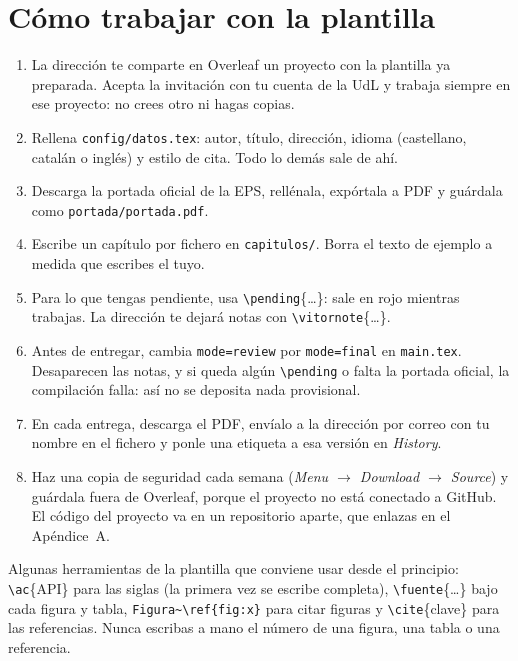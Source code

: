 \documentclass[11pt,a4paper]{article}
\newcommand{\cmd}[1]{\texttt{\textbackslash #1}}
\begin{document}
\section{Cómo trabajar con la plantilla}
\label{sec:plantilla}

\begin{enumerate}
  \item La dirección te comparte en Overleaf un proyecto con la plantilla ya
        preparada. Acepta la invitación con tu cuenta de la UdL y trabaja
        siempre en ese proyecto: no crees otro ni hagas copias.
  \item Rellena \texttt{config/datos.tex}: autor, título, dirección, idioma
        (castellano, catalán o inglés) y estilo de cita. Todo lo demás sale de
        ahí.
  \item Descarga la portada oficial de la EPS, rellénala, expórtala a PDF y
        guárdala como \texttt{portada/portada.pdf}.
  \item Escribe un capítulo por fichero en \texttt{capitulos/}. Borra el texto
        de ejemplo a medida que escribes el tuyo.
  \item Para lo que tengas pendiente, usa \cmd{pending}\{\ldots\}: sale en rojo
        mientras trabajas. La dirección te dejará notas con
        \cmd{vitornote}\{\ldots\}.
  \item Antes de entregar, cambia \texttt{mode=review} por \texttt{mode=final}
        en \texttt{main.tex}. Desaparecen las notas, y si queda algún
        \cmd{pending} o falta la portada oficial, la compilación falla: así no
        se deposita nada provisional.
  \item En cada entrega, descarga el PDF, envíalo a la dirección por correo
        con tu nombre en el fichero y ponle una etiqueta a esa versión en
        \emph{History}.
  \item Haz una copia de seguridad cada semana (\emph{Menu $\rightarrow$
        Download $\rightarrow$ Source}) y guárdala fuera de Overleaf, porque
        el proyecto no está conectado a GitHub. El código del proyecto va en
        un repositorio aparte, que enlazas en el Apéndice~A.
\end{enumerate}

Algunas herramientas de la plantilla que conviene usar desde el principio:
\cmd{ac}\{API\} para las siglas (la primera vez se escribe completa),
\cmd{fuente}\{\ldots\} bajo cada figura y tabla, \texttt{Figura\textasciitilde\cmd{ref}\{fig:x\}}
para citar figuras y \cmd{cite}\{clave\} para las referencias. Nunca escribas a
mano el número de una figura, una tabla o una referencia.
\end{document}
